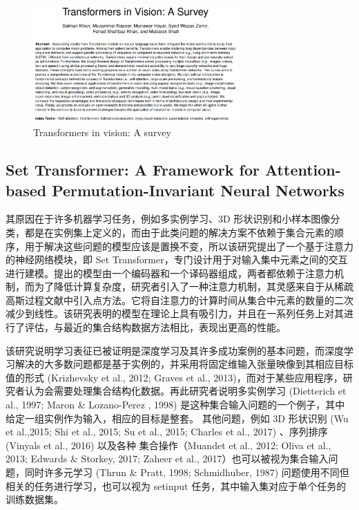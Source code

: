 \begin{figure}[htb]
\centering 
\includegraphics[width=0.7\textwidth]{img/c4y1.png} 
\caption{Transformers in vision: A survey}
\label{Test}
\end{figure}

\subsection{Set Transformer: A Framework for Attention-based Permutation-Invariant Neural Networks}

其原因在于许多机器学习任务，例如多实例学习、3D 形状识别和小样本图像分类，都是在实例集上定义的，而由于此类问题的解决方案不依赖于集合元素的顺序，用于解决这些问题的模型应该是置换不变，所以该研究提出了一个基于注意力的神经网络模块，即 Set Transformer，专门设计用于对输入集中元素之间的交互进行建模。提出的模型由一个编码器和一个译码器组成，两者都依赖于注意力机制，而为了降低计算复杂度，研究者引入了一种注意力机制，其灵感来自于从稀疏高斯过程文献中引入点方法。它将自注意力的计算时间从集合中元素的数量的二次减少到线性。该研究表明的模型在理论上具有吸引力，并且在一系列任务上对其进行了评估，与最近的集合结构数据方法相比，表现出更高的性能。

该研究说明学习表征已被证明是深度学习及其许多成功案例的基本问题，而深度学习解决的大多数问题都是基于实例的，并采用将固定维输入张量映像到其相应目标值的形式 (Krizhevsky et al., 2012; Graves et al., 2013)，而对于某些应用程序，研究者认为会需要处理集合结构化数据。再此研究者说明多实例学习 (Dietterich et al., 1997; Maron \& Lozano-Perez , 1998) 是这种集合输入问题的一个例子，其中给定一组实例作为输入，相应的目标是整套。
其他问题，例如 3D 形状识别 (Wu et al.,2015; Shi et al., 2015; Su et al., 2015; Charles et al., 2017) 、序列排序 (Vinyals et al., 2016) 以及各种 集合操作（Muandet et al., 2012; Oliva et al., 2013; Edwards \& Storkey, 2017; Zaheer et al., 2017）也可以被视为集合输入问题，同时许多元学习 (Thrun \& Pratt, 1998; Schmidhuber, 1987) 问题使用不同但相关的任务进行学习，也可以视为 setinput 任务，其中输入集对应于单个任务的训练数据集。

